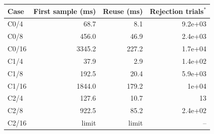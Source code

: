 \begin{tabular}{lrrr}\toprule
Case & First sample (ms) & Reuse (ms) & Rejection trials$^{*}$\\\midrule
C0/4 & 68.7 & 8.1 & 9.2e+03\\
C0/8 & 456.0 & 46.9 & 2.4e+03\\
C0/16 & 3345.2 & 227.2 & 1.7e+04\\
C1/4 & 37.9 & 2.9 & 1.4e+02\\
C1/8 & 192.5 & 20.4 & 5.9e+03\\
C1/16 & 1844.0 & 179.2 & 1e+04\\
C2/4 & 127.6 & 10.7 & 13\\
C2/8 & 922.5 & 85.2 & 2.4e+02\\
C2/16 & limit & limit & --\\
\bottomrule\end{tabular}

